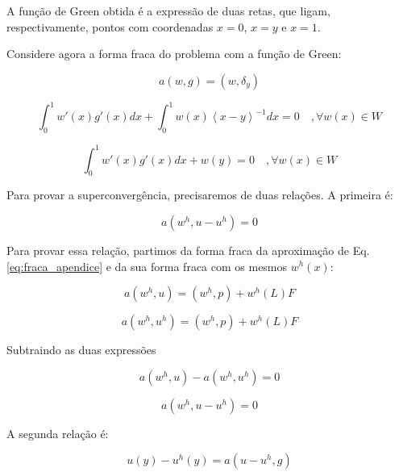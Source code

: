     A função de Green obtida é a expressão de duas retas, que ligam, respectivamente, pontos com coordenadas $x=0$, $x=y$ e $x=1$.

    Considere agora a forma fraca do problema com a função de Green:

    \begin{equation*}
        a(w,g) = (w,\delta_y)
    \end{equation*}

    \begin{equation*}
        \int_{0}^{1} w'(x)g'(x) dx + \int_{0}^{1} w(x)\left\langle x-y\right\rangle^{-1} dx = 0 \quad, \forall w(x) \in W
    \end{equation*}

    \begin{equation*}
        \int_{0}^{1} w'(x)g'(x) dx + w(y) = 0 \quad, \forall w(x) \in W
        \label{eq:green}
    \end{equation*}

    Para provar a superconvergência, precisaremos de duas relações. A primeira é:

    \begin{equation}
        a(w^h, u-u^h)=0
        \label{eq:lem1}
    \end{equation}

    Para provar essa relação, partimos da forma fraca da aproximação de Eq. \eqref{eq:fraca_apendice} e da sua forma fraca com os mesmos $w^h(x)$:

    \begin{equation*}
        a(w^h, u) = (w^h, p) + w^h(L)F
    \end{equation*}

    \begin{equation*}
        a(w^h, u^h) = (w^h, p) + w^h(L)F
    \end{equation*}

    Subtraindo as duas expressões 

    \begin{equation*}
        a(w^h, u) - a(w^h, u^h) = 0
    \end{equation*}

    \begin{equation*}
        a(w^h, u-u^h) = 0
    \end{equation*}

    A segunda relação é:

    \begin{equation}
        u(y) - u^h(y) = a(u-u^h, g)
        \label{eq:lem2}
    \end{equation}

